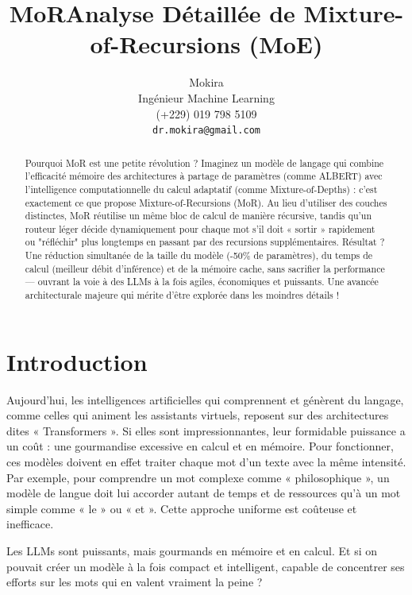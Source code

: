 \documentclass[a4paper]{article}
\title{MoR}
\title{Analyse Détaillée de Mixture-of-Recursions (MoE)}
\author{
 Mokira \\
  Ingénieur Machine Learning \\
  (+229) 019 798 5109 \\
  \texttt{dr.mokira@gmail.com} \\
}
\begin{document}
\maketitle
\begin{abstract}
Pourquoi MoR est une petite révolution ?
Imaginez un modèle de langage qui combine l’efficacité mémoire
des architectures à partage de paramètres (comme ALBERT) avec l’intelligence
computationnelle du calcul adaptatif (comme Mixture-of-Depths) :
c’est exactement ce que propose Mixture-of-Recursions (MoR).
Au lieu d’utiliser des couches distinctes, MoR réutilise un même bloc
de calcul de manière récursive, tandis qu’un routeur léger décide
dynamiquement pour chaque mot s’il doit « sortir » rapidement ou "réfléchir"
plus longtemps en passant par des recursions supplémentaires. Résultat ?
Une réduction simultanée de la taille du modèle (-50\% de paramètres),
du temps de calcul (meilleur débit d’inférence) et de la mémoire cache,
sans sacrifier la performance --- ouvrant la voie à des LLMs à la fois agiles,
économiques et puissants. Une avancée architecturale majeure qui mérite
d’être explorée dans les moindres détails !
\end{abstract}




\section{Introduction}
Aujourd'hui, les intelligences artificielles qui comprennent et génèrent
du langage, comme celles qui animent les assistants virtuels, reposent
sur des architectures dites « Transformers ». Si elles sont impressionnantes,
leur formidable puissance a un coût : une gourmandise excessive en calcul
et en mémoire. Pour fonctionner, ces modèles doivent en effet traiter
chaque mot d'un texte avec la même intensité. Par exemple, pour comprendre
un mot complexe comme « philosophique », un modèle de langue doit lui accorder
autant de temps et de ressources qu’à un mot simple comme « le » ou « et ».
Cette approche uniforme est coûteuse et inefficace.

Les LLMs sont puissants, mais gourmands en mémoire et en calcul.
Et si on pouvait créer un modèle à la fois compact et intelligent,
capable de concentrer ses efforts sur les mots qui en valent vraiment
la peine ?
\end{document}
